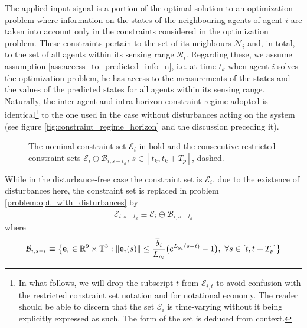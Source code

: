 The applied input signal is a portion of the optimal solution to an
optimization problem where information on the states of the neighbouring agents
of agent $i$ are taken into account only in the constraints considered in the
optimization problem. These constraints pertain to the set of its neighbours
$\mathcal{N}_i$ and, in total, to the set of all agents within its sensing
range $\mathcal{R}_i$. Regarding these, we assume assumption
\eqref{ass:access_to_predicted_info_n}, i.e. at time $t_k$ when agent $i$
solves the optimization problem, he has access to the measurements of the states
and the values of the predicted states for all agents within its sensing range.
Naturally, the inter-agent and intra-horizon constraint regime adopted is
identical\footnote{In what follows, we will drop the subscript $t$ from
$\mathcal{E}_{i,t}$ to avoid confusion with the restricted constraint set
notation and for notational economy. The reader should be able to discern that
the set $\mathcal{E}_i$ is time-varying without it being explicitly expressed as
such. The form of the set is deduced from context.} to the one used in the case
without disturbances acting on the system (see figure
\eqref{fig:constraint_regime_horizon} and the discussion preceding it).

\begin{figure}[ht!]
  \centering
  
  \caption{The nominal constraint set $\mathcal{E}_i$ in bold and the
    consecutive restricted constraint sets $\mathcal{E}_i \ominus \mathcal{B}_{i, s-t_k}$,
    $s \in [t_k, t_k + T_p]$, dashed.}
  \label{fig:tightening_high_level}
\end{figure}

While in the disturbance-free case the constraint set is $\mathcal{E}_i$,
due to the existence of disturbances here, the constraint set is replaced in
problem \eqref{problem:opt_with_disturbances} by
\begin{align}
  \mathcal{E}_{i, s-t_k} \equiv \mathcal{E}_i \ominus \mathcal{B}_{i,s-t_k}
\label{eq:restricted_constraint_set}
\end{align}
where
\begin{align}
  \mathcal{B}_{i,s-t} \equiv \big\{ \bm{\mathbf{e}}_i \in \mathbb{R}^9 \times \mathbb{T}^3 :
    \|\bm{\mathbf{e}}_i(s)\| \leq \dfrac{\overline{\delta}_i}{L_{g_i}}\big( e^{L_{g_i}(s - t)} - 1\big),\ \forall s \in [t, t + T_p] \big\}
\label{eq:b_restricted_constraint_set}
\end{align}


